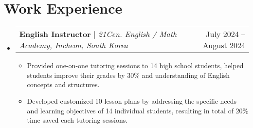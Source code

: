 \documentclass[letterpaper,11pt]{article}
\makeatletter
\newcommand{\resumeItem}[1]{
  \item\small{
    {#1 \vspace{-3pt}}
  }
}
\newcommand{\resumeSubheading}[4]{
  \vspace{-2pt}\item
    \begin{tabular*}{0.97\textwidth}[t]{l@{\extracolsep{\fill}}r@{\hspace{-0.2in}}}
        \textbf{#1} & #2 \\
        \textit{\small#3} & \textit{\small #4} \\
    \end{tabular*}\vspace{-7pt}
}
\newcommand{\resumeProjectHeading}[2]{
    \item
    \begin{tabular*}{0.97\textwidth}{l@{\extracolsep{\fill}}r@{\hspace{-0.2in}}}
        \small#1 & #2 \\
    \end{tabular*}\vspace{-7pt}
}
\newcommand{\resumeSubHeadingListStart}{\begin{itemize}[leftmargin=0.00in, rightmargin=-0.2in, label={}]}
\newcommand{\resumeSubHeadingListEnd}{\end{itemize}}
\newcommand{\resumeItemListStart}{\begin{itemize}[leftmargin=0.15in, rightmargin=0.15in]}
\newcommand{\resumeItemListEnd}{\end{itemize}\vspace{-7pt}}
\makeatother
\begin{document}




\section{Work Experience}
    \vspace{-3pt}

    \resumeSubHeadingListStart
        \resumeProjectHeading
            {\textbf{English Instructor} $|$ \emph{21Cen. English / Math Academy, Incheon, South Korea}}{July 2024 -- August 2024}
            \resumeItemListStart
                \resumeItem{Provided one-on-one tutoring sessions to 14 high school students, helped students improve their grades by 30\% and understanding of English concepts and structures.}
                \resumeItem{Developed customized 10 lesson plans by addressing the specific needs and learning objectives of 14 individual students, resulting in total of 20\% time saved each tutoring sessions.}
            \resumeItemListEnd
        \resumeSubHeadingListEnd
\end{document}
